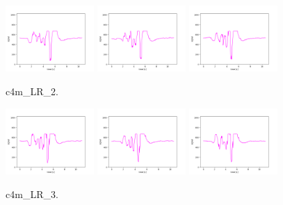 \begin{figure}[!ht]
\begin{center}
\includegraphics[width=0.3\textwidth]{../data/c4m_LR_2/c4m_LR_2_1.png}
\includegraphics[width=0.3\textwidth]{../data/c4m_LR_2/c4m_LR_2_2.png}
\includegraphics[width=0.3\textwidth]{../data/c4m_LR_2/c4m_LR_2_3.png}
\caption{c4m\_LR\_2.\label{fig:c4m_LR_2}}
\end{center}
\end{figure}

\begin{figure}[!ht]
\begin{center}
\includegraphics[width=0.3\textwidth]{../data/c4m_LR_3/c4m_LR_3_1.png}
\includegraphics[width=0.3\textwidth]{../data/c4m_LR_3/c4m_LR_3_2.png}
\includegraphics[width=0.3\textwidth]{../data/c4m_LR_3/c4m_LR_3_3.png}
\caption{c4m\_LR\_3.\label{fig:c4m_LR_3}}
\end{center}
\end{figure}


